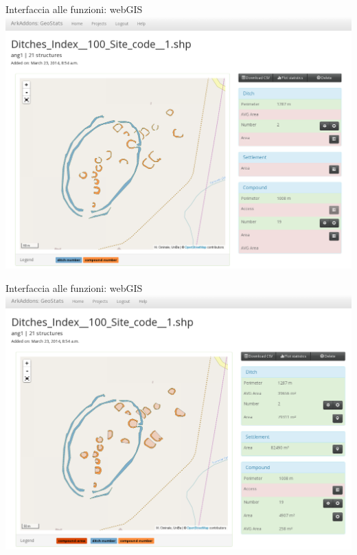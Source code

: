 \documentclass[xcolor=svgnames]{beamer}
\begin{document}
        \begin{frame}{Interfaccia alle funzioni: webGIS}
            \includegraphics[width=1\textwidth]{img/shp-detail-2}
        \end{frame}

        \begin{frame}{Interfaccia alle funzioni: webGIS}
            \includegraphics[width=1\textwidth]{img/shp-detail-3}
        \end{frame}
\end{document}
